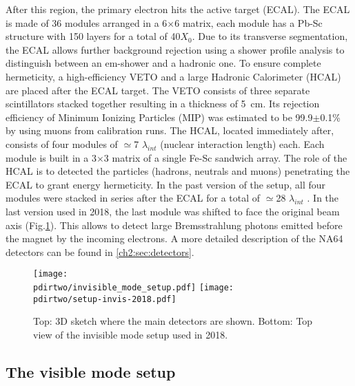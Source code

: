 After this region, the primary electron hits the active target (ECAL). The ECAL is made of 36 modules arranged in a 6$\times$6 matrix, each module has a Pb-Sc structure with 150 layers for a total of 40$X_0$. Due to its transverse segmentation, the ECAL allows further background rejection using a shower profile analysis to distinguish between an em-shower and a hadronic one. To ensure complete hermeticity, a high-efficiency VETO and a large Hadronic Calorimeter (HCAL) are placed after the ECAL target. The VETO consists of three separate scintillators stacked together resulting in a thickness of \SI{5}{\centi\meter}. Its rejection efficiency of Minimum Ionizing Particles (MIP) was estimated to be 99.9$\pm$0.1\% by using muons from calibration runs. The HCAL, located immediately after, consists of four modules of $\simeq$7 $\lambda_{int}$ (nuclear interaction length) each. Each module is built in a 3$\times$3 matrix of a single Fe-Sc sandwich array. The role of the HCAL is to detected the particles (hadrons, neutrals and muons) penetrating the ECAL to grant energy hermeticity. In the past version of the setup, all four modules were stacked in series after the ECAL for a total of $\simeq$28 $\lambda_{int}$ \cite{Banerjee:2016tad}. In the last version used in 2018, the last module was shifted to face the original beam axis (Fig.\ref{fig:setup-invis-2018}). This allows to detect large Bremsstrahlung photons emitted before the magnet by the incoming electrons. A more detailed description of the NA64 detectors can be found in \ref{ch2:sec:detectors}.

\begin{figure}[tbh!]
  \centering
  \texttt{[image: \\pdirtwo/invisible\_mode\_setup.pdf]}
\texttt{[image: \\pdirtwo/setup-invis-2018.pdf]}
\caption[Invisible mode setup 2018]{Top: 3D sketch where the main detectors are shown. Bottom: Top view of the invisible mode setup used in 2018.}
\label{fig:setup-invis-2018}
\end{figure}

\subsection{The visible mode setup}
\label{ch2:sec:vismode}

